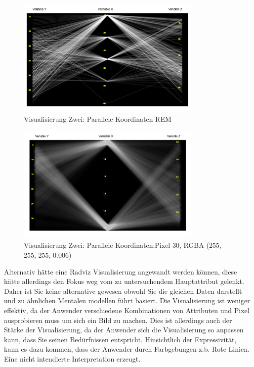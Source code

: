 \documentclass[usegeometry=true]{scrartcl}
\begin{document}
\begin{figure}[h]
  \centering
  \includegraphics[width = 0.8\textwidth]{RoengtenBSP.JPG}
  \caption{Visualisierung Zwei:  Parallele Koordinaten REM  }
\end{figure}



 
\begin{figure}[h]
  \centering
  \includegraphics[width = 0.8\textwidth]{ParalleleBSPPixel.JPG}
  \caption{Visualisierung Zwei: Parallele Koordinaten:Pixel 30, RGBA (255, 255, 255, 0.006) }
\end{figure}

Alternativ hätte eine Radviz Visualisierung angewandt werden können, diese hätte allerdings den Fokus weg vom zu untersuchendem Hauptattribut gelenkt. Daher ist Sie keine alternative gewesen obwohl Sie die gleichen Daten darstellt und zu ähnlichen Mentalen modellen führt basiert.
Die Visualisierung ist weniger effektiv, da der Anwender verschiedene Kombinationen von Attributen und Pixel ausprobieren muss um sich ein Bild zu machen. Dies ist allerdings auch der Stärke der Visualisierung, da der Anwender sich die Visualisierung so anpassen kann, dass Sie seinen Bedürfnissen entspricht. Hinsichtlich der Expressivität, kann es dazu kommen, dass der Anwender durch Farbgebungen z.b. Rote Linien. Eine nicht intendierte Interpretation erzeugt.
\end{document}

